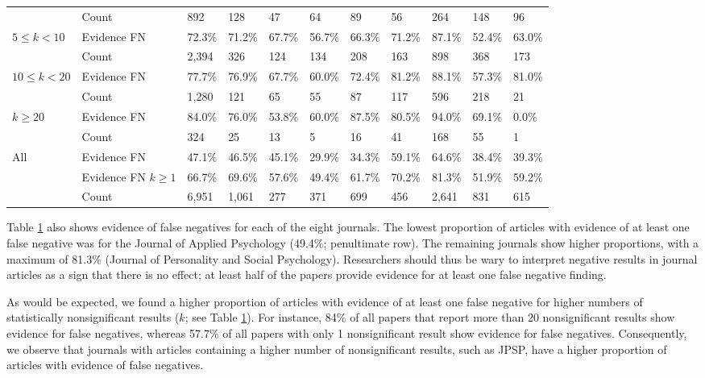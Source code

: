 \documentclass{article}
\begin{document}
\begin{table}[htbp]
\begin{adjustbox}{width=\textwidth,totalheight=\textheight,keepaspectratio,angle=0}
\begin{tabular}{lllllllllll}
& Count             & 892    & 128    & 47     & 64     & 89     & 56     & 264    & 148    & 96     \\
$5\leq k<10$  & Evidence FN       & 72.3\% & 71.2\% & 67.7\% & 56.7\% & 66.3\% & 71.2\% & 87.1\% & 52.4\% & 63.0\% \\
& Count             & 2,394   & 326    & 124    & 134    & 208    & 163    & 898    & 368    & 173    \\
$10\leq k<20$ & Evidence FN       & 77.7\% & 76.9\% & 67.7\% & 60.0\% & 72.4\% & 81.2\% & 88.1\% & 57.3\% & 81.0\% \\
& Count             & 1,280   & 121    & 65     & 55     & 87     & 117    & 596    & 218    & 21     \\
$k\geq20$              & Evidence FN       & 84.0\% & 76.0\% & 53.8\% & 60.0\% & 87.5\% & 80.5\% & 94.0\% & 69.1\% & 0.0\%  \\
& Count             & 324    & 25     & 13     & 5      & 16     & 41     & 168    & 55     & 1      \\
\hline
All                 & Evidence FN       & 47.1\% & 46.5\% & 45.1\% & 29.9\% & 34.3\% & 59.1\% & 64.6\% & 38.4\% & 39.3\% \\
& Evidence FN $k\geq1$ & 66.7\% & 69.6\% & 57.6\% & 49.4\% & 61.7\% & 70.2\% & 81.3\% & 51.9\% & 59.2\% \\
& Count             & 6,951   & 1,061   & 277    & 371    & 699    & 456    & 2,641   & 831    & 615   \\
\hline
\end{tabular}
\end{adjustbox}
\label{tab:tab4}
\end{table}

Table \ref{tab:tab4} also shows evidence of false negatives for each of the eight journals. The lowest proportion of articles with evidence of at least one false negative was for the Journal of Applied Psychology (49.4\%; penultimate row). The remaining journals show higher proportions, with a maximum of 81.3\% (Journal of Personality and Social Psychology). Researchers should thus be wary to interpret negative results in journal articles as a sign that there is no effect; at least half of the papers provide evidence for at least one false negative finding.

As would be expected, we found a higher proportion of articles with evidence of at least one false negative for higher numbers of statistically nonsignificant results ($k$; see Table \ref{tab:tab4}). For instance, 84\% of all papers that report more than 20 nonsignificant results show evidence for false negatives, whereas 57.7\% of all papers with only 1 nonsignificant result show evidence for false negatives. Consequently, we observe that journals with articles containing a higher number of nonsignificant results, such as JPSP, have a higher proportion of articles with evidence of false negatives. 
\end{document}
